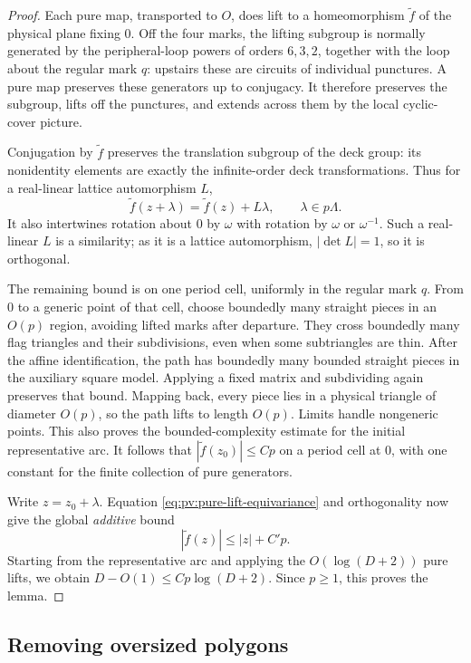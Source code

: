 \begin{proof}
Each pure map, transported to \(O\), does lift to a homeomorphism
\(\widetilde f\) of the physical plane fixing 0. Off the four marks, the
lifting subgroup is normally generated by the peripheral-loop powers of
orders \(6,3,2\), together with the loop about the regular mark \(q\):
upstairs these are circuits of individual punctures. A pure map preserves
these generators up to conjugacy. It therefore preserves the subgroup,
lifts off the punctures, and extends across them by the local cyclic-cover
picture.

Conjugation by \(\widetilde f\) preserves the translation subgroup of the
deck group: its nonidentity elements are exactly the infinite-order deck
transformations. Thus for a real-linear lattice automorphism \(L\),
\begin{equation}\label{eq:pv:pure-lift-equivariance}
 \widetilde f(z+\lambda)=\widetilde f(z)+L\lambda,
 \qquad \lambda\in p\Lambda.
\end{equation}
It also intertwines rotation about 0 by \(\omega\) with rotation by
\(\omega\) or \(\omega^{-1}\). Such a real-linear \(L\) is a similarity;
as it is a lattice automorphism, \(|\det L|=1\), so it is orthogonal.

The remaining bound is on one period cell, uniformly in the regular mark
\(q\). From 0 to a generic point of that cell, choose boundedly many
straight pieces in an \(O(p)\) region, avoiding lifted marks after departure.
They cross boundedly many flag triangles and their subdivisions, even when
some subtriangles are thin. After the affine identification, the path has
boundedly many bounded straight pieces in the auxiliary square model.
Applying a fixed matrix and subdividing again preserves that bound. Mapping
back, every piece lies in a physical triangle of diameter \(O(p)\), so the
path lifts to length \(O(p)\). Limits handle nongeneric points. This also
proves the bounded-complexity estimate for the initial representative arc.
It follows that \(|\widetilde f(z_0)|\le C p\) on a period cell at 0, with
one constant for the finite collection of pure generators.

Write \(z=z_0+\lambda\). Equation
\eqref{eq:pv:pure-lift-equivariance} and orthogonality now give the global
\emph{additive} bound
\[
 |\widetilde f(z)|\le |z|+C'p.
\]
Starting from the representative arc and applying the
\(O(\log(D+2))\) pure lifts, we obtain
\(D-O(1)\le Cp\log(D+2)\). Since \(p\ge1\), this proves the lemma.
\end{proof}

\subsection{Removing oversized polygons}

